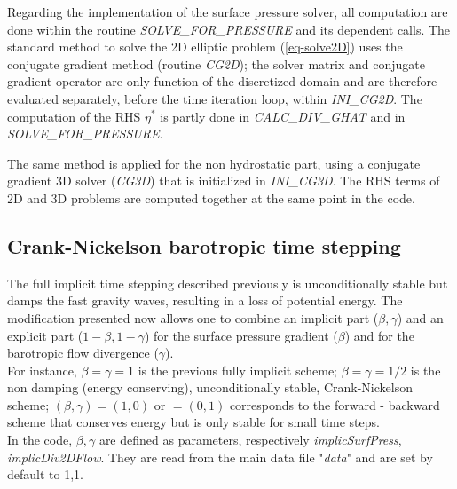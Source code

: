Regarding the implementation of the surface pressure solver, all
computation are done within the routine {\it SOLVE\_FOR\_PRESSURE} and
its dependent calls.  The standard method to solve the 2D elliptic
problem (\ref{eq-solve2D}) uses the conjugate gradient method (routine
{\it CG2D}); the solver matrix and conjugate gradient operator are
only function of the discretized domain and are therefore evaluated
separately, before the time iteration loop, within {\it INI\_CG2D}.
The computation of the RHS $\eta^*$ is partly done in {\it
CALC\_DIV\_GHAT} and in {\it SOLVE\_FOR\_PRESSURE}.

The same method is applied for the non hydrostatic part, using a
conjugate gradient 3D solver ({\it CG3D}) that is initialized in {\it
INI\_CG3D}. The RHS terms of 2D and 3D problems are computed together
at the same point in the code.


\subsection{Crank-Nickelson barotropic time stepping}

The full implicit time stepping described previously is
unconditionally stable but damps the fast gravity waves, resulting in
a loss of potential energy.  The modification presented now allows one
to combine an implicit part ($\beta,\gamma$) and an explicit part
($1-\beta,1-\gamma$) for the surface pressure gradient ($\beta$) and
for the barotropic flow divergence ($\gamma$).
\\
For instance, $\beta=\gamma=1$ is the previous fully implicit scheme;
$\beta=\gamma=1/2$ is the non damping (energy conserving), unconditionally
stable, Crank-Nickelson scheme; $(\beta,\gamma)=(1,0)$ or $=(0,1)$
corresponds to the forward - backward scheme that conserves energy but is
only stable for small time steps.\\
In the code, $\beta,\gamma$ are defined as parameters, respectively 
{\it implicSurfPress}, {\it implicDiv2DFlow}. They are read from
the main data file "{\it data}" and are set by default to 1,1.

